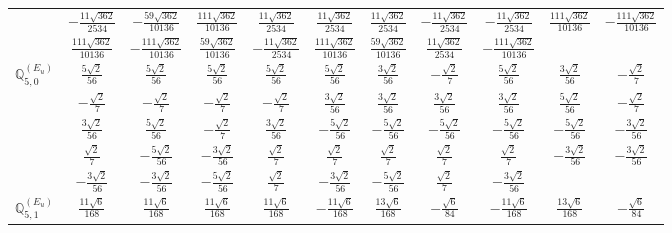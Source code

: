 \documentclass[fleqn,10pt,landscape]{article}
\begin{document}
\begin{itemize}
{\begin{center}
\begin{longtable}{ccccccccccc}
& $ - \frac{11 \sqrt{362}}{2534} $ & $ - \frac{59 \sqrt{362}}{10136} $ & $ \frac{111 \sqrt{362}}{10136} $ & $ \frac{11 \sqrt{362}}{2534} $ & $ \frac{11 \sqrt{362}}{2534} $ & $ \frac{11 \sqrt{362}}{2534} $ & $ - \frac{11 \sqrt{362}}{2534} $ & $ - \frac{11 \sqrt{362}}{2534} $ & $ \frac{111 \sqrt{362}}{10136} $ & $ - \frac{111 \sqrt{362}}{10136} $ \\
& $ \frac{111 \sqrt{362}}{10136} $ & $ - \frac{111 \sqrt{362}}{10136} $ & $ \frac{59 \sqrt{362}}{10136} $ & $ - \frac{11 \sqrt{362}}{2534} $ & $ \frac{111 \sqrt{362}}{10136} $ & $ \frac{59 \sqrt{362}}{10136} $ & $ \frac{11 \sqrt{362}}{2534} $ & $ - \frac{111 \sqrt{362}}{10136} $ & $  $ & $  $ \\ \hline
$\mathbb{Q}_{5,0}^{(E_{u})}$ & $ \frac{5 \sqrt{2}}{56} $ & $ \frac{5 \sqrt{2}}{56} $ & $ \frac{5 \sqrt{2}}{56} $ & $ \frac{5 \sqrt{2}}{56} $ & $ \frac{5 \sqrt{2}}{56} $ & $ \frac{3 \sqrt{2}}{56} $ & $ - \frac{\sqrt{2}}{7} $ & $ \frac{5 \sqrt{2}}{56} $ & $ \frac{3 \sqrt{2}}{56} $ & $ - \frac{\sqrt{2}}{7} $ \\
& $ - \frac{\sqrt{2}}{7} $ & $ - \frac{\sqrt{2}}{7} $ & $ - \frac{\sqrt{2}}{7} $ & $ - \frac{\sqrt{2}}{7} $ & $ \frac{3 \sqrt{2}}{56} $ & $ \frac{3 \sqrt{2}}{56} $ & $ \frac{3 \sqrt{2}}{56} $ & $ \frac{3 \sqrt{2}}{56} $ & $ \frac{5 \sqrt{2}}{56} $ & $ - \frac{\sqrt{2}}{7} $ \\
& $ \frac{3 \sqrt{2}}{56} $ & $ \frac{5 \sqrt{2}}{56} $ & $ - \frac{\sqrt{2}}{7} $ & $ \frac{3 \sqrt{2}}{56} $ & $ - \frac{5 \sqrt{2}}{56} $ & $ - \frac{5 \sqrt{2}}{56} $ & $ - \frac{5 \sqrt{2}}{56} $ & $ - \frac{5 \sqrt{2}}{56} $ & $ - \frac{5 \sqrt{2}}{56} $ & $ - \frac{3 \sqrt{2}}{56} $ \\
& $ \frac{\sqrt{2}}{7} $ & $ - \frac{5 \sqrt{2}}{56} $ & $ - \frac{3 \sqrt{2}}{56} $ & $ \frac{\sqrt{2}}{7} $ & $ \frac{\sqrt{2}}{7} $ & $ \frac{\sqrt{2}}{7} $ & $ \frac{\sqrt{2}}{7} $ & $ \frac{\sqrt{2}}{7} $ & $ - \frac{3 \sqrt{2}}{56} $ & $ - \frac{3 \sqrt{2}}{56} $ \\
& $ - \frac{3 \sqrt{2}}{56} $ & $ - \frac{3 \sqrt{2}}{56} $ & $ - \frac{5 \sqrt{2}}{56} $ & $ \frac{\sqrt{2}}{7} $ & $ - \frac{3 \sqrt{2}}{56} $ & $ - \frac{5 \sqrt{2}}{56} $ & $ \frac{\sqrt{2}}{7} $ & $ - \frac{3 \sqrt{2}}{56} $ & $  $ & $  $ \\ \hline
$\mathbb{Q}_{5,1}^{(E_{u})}$ & $ \frac{11 \sqrt{6}}{168} $ & $ \frac{11 \sqrt{6}}{168} $ & $ \frac{11 \sqrt{6}}{168} $ & $ \frac{11 \sqrt{6}}{168} $ & $ - \frac{11 \sqrt{6}}{168} $ & $ \frac{13 \sqrt{6}}{168} $ & $ - \frac{\sqrt{6}}{84} $ & $ - \frac{11 \sqrt{6}}{168} $ & $ \frac{13 \sqrt{6}}{168} $ & $ - \frac{\sqrt{6}}{84} $ \\

\end{longtable}
\end{center}}
\end{itemize}
\end{document}
